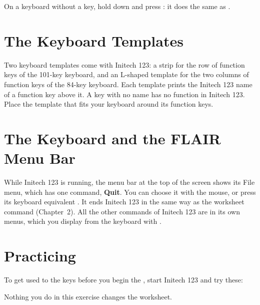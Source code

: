 \begin{Note}
On a keyboard without a  key, hold down  and press
: it does the same as .
\end{Note}

\section{The Keyboard Templates}
Two keyboard templates come with Initech 123: a strip for the row of
function keys of the 101-key keyboard, and an L-shaped template for the two
columns of function keys of the 84-key keyboard.  Each template prints the
Initech 123 name of a function key above it.  A key with no name has no
function in Initech 123.  Place the template that fits your keyboard around
its function keys.

\section{The Keyboard and the FLAIR Menu Bar}
While Initech 123 is running, the menu bar at the top of the screen shows
its File menu, which has one command, \textbf{Quit}.  You can choose it
with the mouse, or press its keyboard equivalent .  It ends
Initech 123 in the same way as the worksheet command 
(Chapter~2).  All the other commands of Initech 123 are in its own menus,
which you display from the keyboard with .

\section{Practicing}
To get used to the keys before you begin the , start
Initech 123 and try these:
\begin{Keystrokes}
\end{Keystrokes}
Nothing you do in this exercise changes the worksheet.
